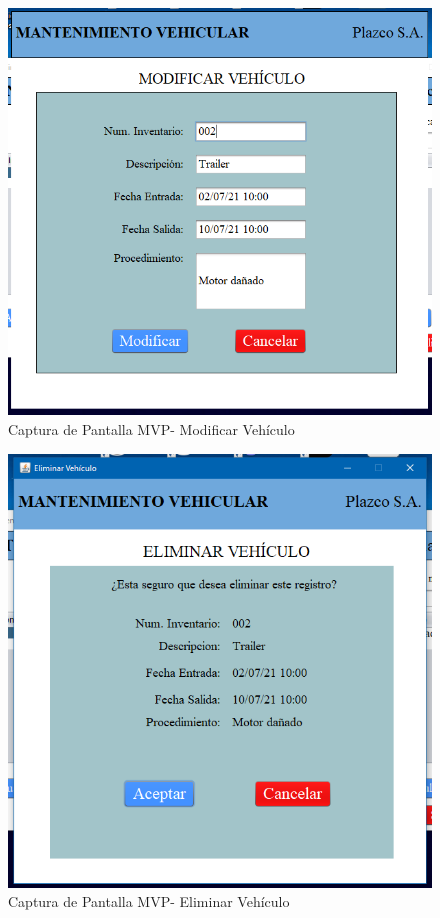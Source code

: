 \begin{figure}
	\centering
	\includegraphics[width=1\textwidth]{./apendice/imagenes/modificar}
	\caption{Captura de Pantalla MVP- Modificar Vehículo}
	\label{fig:Captura de Pantalla MVP- Modificar Vehiculo}
\end{figure}

\begin{figure}
	\centering
	\includegraphics[width=1\textwidth]{./apendice/imagenes/eliminar}
	\caption{Captura de Pantalla MVP- Eliminar Vehículo}
	\label{fig:Captura de Pantalla MVP- Eliminar Vehiculo}
\end{figure}